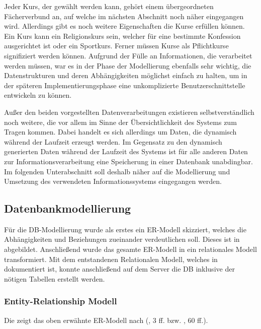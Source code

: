 Jeder Kurs, der gewählt werden kann, gehört einem übergeordneten Fächerverbund an, auf welche im nächsten Abschnitt noch näher eingegangen wird.
Allerdings gibt es noch weitere Eigenschaften die Kurse erfüllen können. Ein Kurs kann ein Religionskurs sein, welcher für eine bestimmte Konfession ausgerichtet ist oder ein Sportkurs.
Ferner müssen Kurse als Pflichtkurse signifiziert werden können.
Aufgrund der Fülle an Informationen, die verarbeitet werden müssen, war es in der Phase der Modellierung ebenfalls sehr wichtig, die Datenstrukturen und deren Abhängigkeiten möglichst einfach zu halten, um in der späteren Implementierungsphase eine unkomplizierte Benutzerschnittstelle entwickeln zu können. 

Außer den beiden vorgestellten Datenverarbeitungen existieren selbstverständlich noch weitere, die vor allem im Sinne der Übersichtlichkeit des Systems zum Tragen kommen. 
Dabei handelt es sich allerdings um Daten, die dynamisch während der Laufzeit erzeugt werden.
Im Gegensatz zu den dynamisch generierten Daten während der Laufzeit des Systems ist für alle anderen Daten zur Informationsverarbeitung eine Speicherung in einer Datenbank unabdingbar.
Im folgenden Unterabschnitt soll deshalb näher auf die Modellierung und Umsetzung des verwendeten Informationssystems eingegangen werden.

\subsection{Datenbankmodellierung}\label{subsec:Datenbankmodellierung}

Für die \ac{DB}-Modellierung wurde als erstes ein \ac{ER-Modell} skizziert, welches die Abhängigkeiten und Beziehungen zueinander verdeutlichen soll. Dieses ist in  abgebildet. Anschließend wurde das gesamte \ac{ER-Modell} in ein relationales Modell transformiert.
Mit dem entstandenen Relationalen Modell, welches in  dokumentiert ist, konnte anschließend auf dem Server die \ac{DB} inklusive der nötigen Tabellen erstellt werden.

\subsubsection{Entity-Relationship Modell}\label{subsec:ERModell}

Die  zeigt das oben erwähnte \ac{ER-Modell} nach  (\cite{ChenPe}, 3 ff. bzw. \cite{VossenG-DDD}, 60 ff.).

